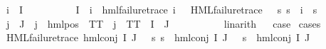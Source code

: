 \begin{isabellebody}
{\isacharbar}{\kern0pt}\ {\isachardoublequoteopen}{\isacharparenleft}{\kern0pt}{\isasymexists}i{\isasymin}{\isasymPhi}\ {\isacharbackquote}{\kern0pt}\ I{\isachardot}{\kern0pt}\isanewline
\ \ \ \ \ \ \ \ {\isasymPhi}\ {\isacharbackquote}{\kern0pt}\ I\ {\isacharequal}{\kern0pt}\ {\isacharbraceleft}{\kern0pt}i{\isacharbraceright}{\kern0pt}\ {\isasymand}\ hml{\isacharunderscore}{\kern0pt}failure{\isacharunderscore}{\kern0pt}trace\ i\ {\isasymand}\ {\isacharparenleft}{\kern0pt}{\isasymexists}{\isasympsi}{\isachardot}{\kern0pt}\ HML{\isacharunderscore}{\kern0pt}failure{\isacharunderscore}{\kern0pt}trace\ {\isasympsi}\ {\isasymand}\ {\isacharparenleft}{\kern0pt}{\isasymforall}s{\isachardot}{\kern0pt}\ {\isacharparenleft}{\kern0pt}s\ {\isasymTurnstile}\ i{\isacharparenright}{\kern0pt}\ {\isacharequal}{\kern0pt}\ {\isacharparenleft}{\kern0pt}s\ {\isasymTurnstile}\ {\isasympsi}{\isacharparenright}{\kern0pt}{\isacharparenright}{\kern0pt}{\isacharparenright}{\kern0pt}{\isacharparenright}{\kern0pt}\isanewline
{\isasymand}\ {\isacharparenleft}{\kern0pt}{\isasymforall}j{\isasymin}{\isasymPhi}\ {\isacharbackquote}{\kern0pt}\ J{\isachardot}{\kern0pt}\ {\isasymexists}{\isasymalpha}{\isachardot}{\kern0pt}\ j\ {\isacharequal}{\kern0pt}\ hml{\isacharunderscore}{\kern0pt}pos\ {\isasymalpha}\ TT\ {\isasymor}\ j\ {\isacharequal}{\kern0pt}\ TT{\isacharparenright}{\kern0pt}\ {\isasymand}\ I\ {\isasyminter}\ J\ {\isasymnoteq}\ {\isacharbraceleft}{\kern0pt}{\isacharbraceright}{\kern0pt}{\isachardoublequoteclose}\isanewline
\ \ \ \ \isamarkupfalse%
\ {}\ \isamarkupfalse%
\ linarith\isanewline
{}\isamarkupfalse%
\ \isamarkupfalse%
\ {\isacharquery}{\kern0pt}case\ \isamarkupfalse%
{\isacharparenleft}{\kern0pt}cases{\isacharparenright}{\kern0pt}\isanewline
\ \ \isamarkupfalse%
\ {}\isanewline
\ \ \isamarkupfalse%
\ {\isachardoublequoteopen}HML{\isacharunderscore}{\kern0pt}failure{\isacharunderscore}{\kern0pt}trace\ {\isacharparenleft}{\kern0pt}hml{\isacharunderscore}{\kern0pt}conj\ I\ J\ {\isasymPhi}{\isacharparenright}{\kern0pt}\ {\isasymand}\ {\isacharparenleft}{\kern0pt}{\isasymforall}s{\isachardot}{\kern0pt}\ {\isacharparenleft}{\kern0pt}s\ {\isasymTurnstile}\ hml{\isacharunderscore}{\kern0pt}conj\ I\ J\ {\isasymPhi}{\isacharparenright}{\kern0pt}\ {\isacharequal}{\kern0pt}\ {\isacharparenleft}{\kern0pt}s\ {\isasymTurnstile}\ {\isacharparenleft}{\kern0pt}hml{\isacharunderscore}{\kern0pt}conj\ I\ J\ {\isasymPhi}{\isacharparenright}{\kern0pt}{\isacharparenright}{\kern0pt}{\isacharparenright}{\kern0pt}{\isachardoublequoteclose}\isanewline

\end{isabellebody}
